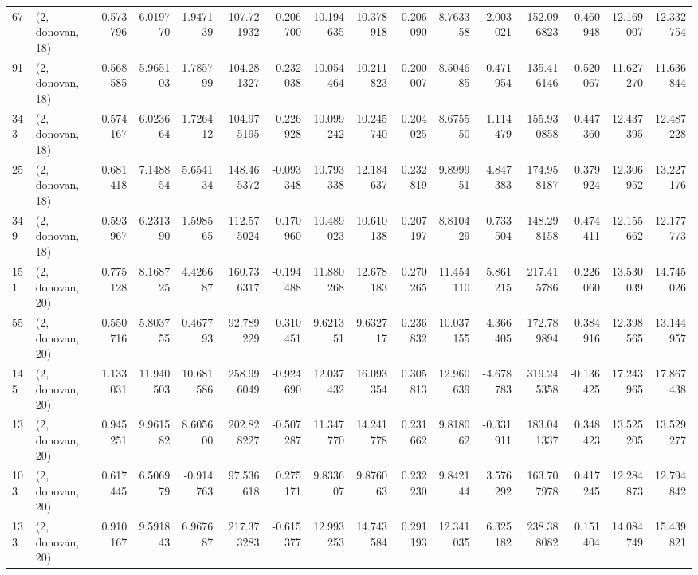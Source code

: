 \begin{tabular}{llrrrrrrrrrrrrrr}
67  &  (2, donovan, 18) &   0.573796 &   6.019770 &   1.947139 &   107.721932 &   0.206700 &  10.194635 &  10.378918 &  0.206090 &   8.763358 &   2.003021 &    152.096823 &    0.460948 &   12.169007 &   12.332754 \\
91  &  (2, donovan, 18) &   0.568585 &   5.965103 &   1.785799 &   104.281327 &   0.232038 &  10.054464 &  10.211823 &  0.200007 &   8.504685 &   0.471954 &    135.416146 &    0.520067 &   11.627270 &   11.636844 \\
343 &  (2, donovan, 18) &   0.574167 &   6.023664 &   1.726412 &   104.975195 &   0.226928 &  10.099242 &  10.245740 &  0.204025 &   8.675550 &   1.114479 &    155.930858 &    0.447360 &   12.437395 &   12.487228 \\
25  &  (2, donovan, 18) &   0.681418 &   7.148854 &   5.654134 &   148.465372 &  -0.093348 &  10.793338 &  12.184637 &  0.232819 &   9.899951 &   4.847383 &    174.958187 &    0.379924 &   12.306952 &   13.227176 \\
349 &  (2, donovan, 18) &   0.593967 &   6.231390 &   1.598565 &   112.575024 &   0.170960 &  10.489023 &  10.610138 &  0.207197 &   8.810429 &   0.733504 &    148.298158 &    0.474411 &   12.155662 &   12.177773 \\
151 &  (2, donovan, 20) &   0.775128 &   8.168725 &   4.426687 &   160.736317 &  -0.194488 &  11.880268 &  12.678183 &  0.270265 &  11.454110 &   5.861215 &    217.415786 &    0.226060 &   13.530039 &   14.745026 \\
55  &  (2, donovan, 20) &   0.550716 &   5.803755 &   0.467793 &    92.789229 &   0.310451 &   9.621351 &   9.632717 &  0.236832 &  10.037155 &   4.366405 &    172.789894 &    0.384916 &   12.398565 &   13.144957 \\
145 &  (2, donovan, 20) &   1.133031 &  11.940503 &  10.681586 &   258.996049 &  -0.924690 &  12.037432 &  16.093354 &  0.305813 &  12.960639 &  -4.678783 &    319.245358 &   -0.136425 &   17.243965 &   17.867438 \\
13  &  (2, donovan, 20) &   0.945251 &   9.961582 &   8.605600 &   202.828227 &  -0.507287 &  11.347770 &  14.241778 &  0.231662 &   9.818062 &  -0.331911 &    183.041337 &    0.348423 &   13.525205 &   13.529277 \\
103 &  (2, donovan, 20) &   0.617445 &   6.506979 &  -0.914763 &    97.536618 &   0.275171 &   9.833607 &   9.876063 &  0.232230 &   9.842144 &   3.576292 &    163.707978 &    0.417245 &   12.284873 &   12.794842 \\
133 &  (2, donovan, 20) &   0.910167 &   9.591843 &   6.967687 &   217.373283 &  -0.615377 &  12.993253 &  14.743584 &  0.291193 &  12.341035 &   6.325182 &    238.388082 &    0.151404 &   14.084749 &   15.439821 \\

\end{tabular}
